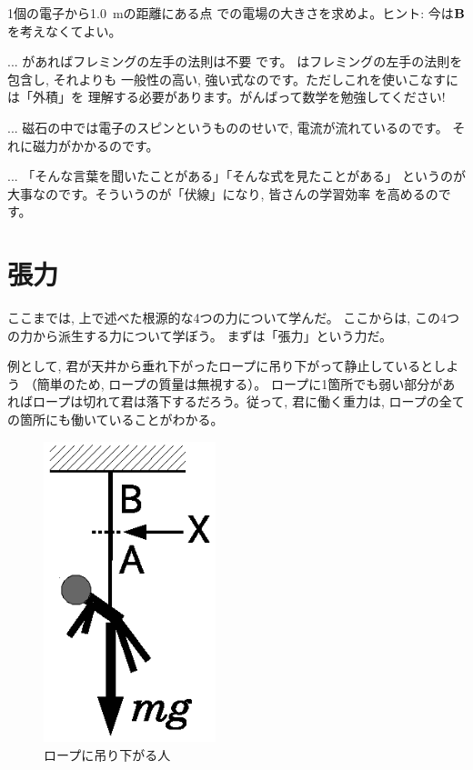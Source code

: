 \begin{q}\label{q:Coulomb_EF} 1個の電子から1.0~mの距離にある点
での電場の大きさを求めよ。ヒント: 今は${\bf B}$を考えなくてよい。\end{q}\mv

\begin{faq}{\small{}
... があればフレミングの左手の法則は不要
です。
はフレミングの左手の法則を包含し, それよりも
一般性の高い, 強い式なのです。ただしこれを使いこなすには「外積」を
理解する必要があります。がんばって数学を勉強してください!}\end{faq}

\begin{faq}{\small{}
... 磁石の中では電子のスピンというもののせいで, 電流が流れているのです。
それに磁力がかかるのです。}\end{faq}

\begin{faq}{\small{}
... 「そんな言葉を聞いたことがある」「そんな式を見たことがある」
というのが大事なのです。そういうのが「伏線」になり, 皆さんの学習効率
を高めるのです。}\end{faq}\mv


\section{張力}
ここまでは, 上で述べた根源的な4つの力について学んだ。
ここからは, この4つの力から派生する力について学ぼう。
まずは「張力」という力だ。

例として, 君が天井から垂れ下がったロープに吊り下がって静止しているとしよう
（簡単のため, ロープの質量は無視する）。
ロープに1箇所でも弱い部分があればロープは切れて君は落下するだろう。従って, 
君に働く重力は, ロープの全ての箇所にも働いていることがわかる。
\begin{figure}[h]
    \centering
    \includegraphics[width=5cm]{string.eps}
    \caption{ロープに吊り下がる人}\label{fig:string}
\end{figure}

